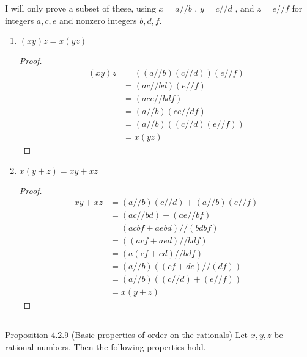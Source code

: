 \documentclass[../../main.tex]{subfiles}
\begin{document}
I will only prove a subset of these, using $x = a // b$ , $y = c // d$ , and $z = e // f$ for integers $a, c, e$ and nonzero integers $b, d, f$.
\begin{enumerate}
    \item
        \begin{q}
            $(x y)z = x(yz)$
        \end{q}
        \begin{proof}
            \begin{align*}
                (xy)z &= ((a // b)(c // d))(e // f) \\
                &= (ac // bd)(e // f) \\
                &= (ace // bdf) \\
                &= (a // b)(ce // df) \\
                &= (a // b)((c // d)(e // f)) \\
                &= x(yz) 
            \end{align*}
        \end{proof}
    \item 
        \begin{q}
            $x(y + z) = x y + x z$
        \end{q}
        \begin{proof}
            \begin{align*}
                xy + xz &= (a // b)(c // d) + (a // b)(e // f) \\
                &= (ac // bd) + (ae // bf) \\
                &= (acbf + aebd) // (bdbf) \\
                &= ((acf + aed) // bdf) \\
                &= (a(cf + ed) // bdf) \\
                &= (a // b)((cf + de) // (df)) \\
                &= (a // b)((c // d) + (e // f)) \\
                &= x(y+z)
            \end{align*}
        \end{proof} 
\end{enumerate}

\addtocounter{subsection}{1}
\subsection{}
\begin{q}
    Proposition 4.2.9 (Basic properties of order on the rationals) Let $x, y,z$ be rational
numbers. Then the following properties hold.
\end{q}
\end{document}
